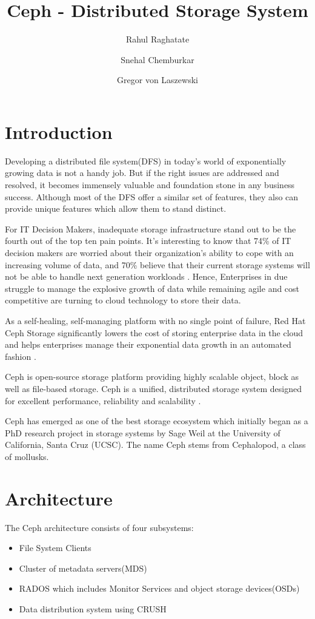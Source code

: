 \documentclass[9pt,twocolumn,twoside]{styles/osajnl}
\title{Ceph - Distributed Storage System}
\author[1]{Rahul Raghatate}
\author[1]{Snehal Chemburkar}
\author[1,*]{Gregor von Laszewski}
\affil[1]{School of Informatics and Computing, Bloomington, IN 47408, U.S.A.}
\affil[*]{Corresponding authors: laszewski@gmail.com}
\begin{document}
\maketitle

\section{Introduction}

Developing a distributed file system(DFS) in today's world of
exponentially growing data is not a handy job. But if the right issues
are addressed and resolved, it becomes immensely valuable and
foundation stone in any business success. Although most of the DFS
offer a similar set of features, they also can provide unique features
which allow them to stand distinct.

For IT Decision Makers, inadequate storage infrastructure stand out to
be the fourth out of the top ten pain points. It's interesting to know
that 74\% of IT decision makers are worried about their organization’s
ability to cope with an increasing volume of data, and 70\% believe
that their current storage systems will not be able to handle next
generation workloads \cite{ceph-redhat-datasheet}. Hence, Enterprises
in due struggle to manage the explosive growth of data while remaining
agile and cost competitive are turning to cloud technology to store
their data.

As a self-healing, self-managing platform with no single point of
failure, Red Hat Ceph Storage significantly lowers the cost of storing
enterprise data in the cloud and helps enterprises manage their
exponential data growth in an automated fashion
\cite{ceph-redhat-datasheet}.

Ceph is open-source storage platform providing highly scalable object,
block as well as file-based storage. Ceph is a unified, distributed
storage system designed for excellent performance, reliability and
scalability \cite{www-ceph}.

Ceph has emerged as one of the best storage ecosystem which initially
began as a PhD research project in storage systems by Sage Weil at the
University of California, Santa Cruz (UCSC). The name Ceph stems from
Cephalopod, a class of mollusks.


\section{Architecture}

The Ceph architecture consists of four subsystems:
\begin{itemize}
\item File System Clients
\item Cluster of metadata servers(MDS)
\item RADOS which includes Monitor Services and object storage
  devices(OSDs)
\item Data distribution system using CRUSH
\end{itemize}
\end{document}
